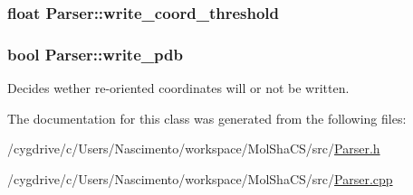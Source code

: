 \hypertarget{classParser_a136c2191cbc90fcce8277ad2f98031b8}{
\subsubsection[{write\_\-coord\_\-threshold}]{\setlength{\rightskip}{0pt plus 5cm}float {\bf Parser::write\_\-coord\_\-threshold}}}
\label{classParser_a136c2191cbc90fcce8277ad2f98031b8}
\hypertarget{classParser_ae5704efc1c1353fdc47e1e8c369516fc}{
\subsubsection[{write\_\-pdb}]{\setlength{\rightskip}{0pt plus 5cm}bool {\bf Parser::write\_\-pdb}}}
\label{classParser_ae5704efc1c1353fdc47e1e8c369516fc}


Decides wether re-\/oriented coordinates will or not be written. 



The documentation for this class was generated from the following files:\begin{DoxyCompactItemize}
\item 
/cygdrive/c/Users/Nascimento/workspace/MolShaCS/src/\hyperlink{Parser_8h}{Parser.h}\item 
/cygdrive/c/Users/Nascimento/workspace/MolShaCS/src/\hyperlink{Parser_8cpp}{Parser.cpp}\end{DoxyCompactItemize}
